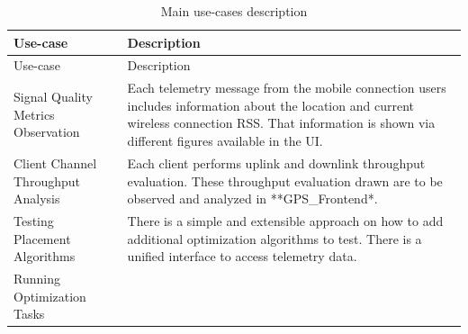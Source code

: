 \begin{longtable}[]{@{}ll@{}}
\caption{Main use-cases description}\tabularnewline
\toprule
\begin{minipage}[b]{0.31\columnwidth}\raggedright
Use-case\strut
\end{minipage} & \begin{minipage}[b]{0.63\columnwidth}\raggedright
Description\strut
\end{minipage}\tabularnewline
\midrule
\endfirsthead
\toprule
\begin{minipage}[b]{0.31\columnwidth}\raggedright
Use-case\strut
\end{minipage} & \begin{minipage}[b]{0.63\columnwidth}\raggedright
Description\strut
\end{minipage}\tabularnewline
\midrule
\endhead
\begin{minipage}[t]{0.31\columnwidth}\raggedright
Signal Quality Metrics Observation\strut
\end{minipage} & \begin{minipage}[t]{0.63\columnwidth}\raggedright
Each telemetry message from the mobile connection users includes
information about the location and current wireless connection RSS. That
information is shown via different figures available in the UI.\strut
\end{minipage}\tabularnewline
\begin{minipage}[t]{0.31\columnwidth}\raggedright
Client Channel Throughput Analysis\strut
\end{minipage} & \begin{minipage}[t]{0.63\columnwidth}\raggedright
Each client performs uplink and downlink throughput evaluation. These
throughput evaluation drawn are to be observed and analyzed in
**GPS\_Frontend*.\strut
\end{minipage}\tabularnewline
\begin{minipage}[t]{0.31\columnwidth}\raggedright
Testing Placement Algorithms\strut
\end{minipage} & \begin{minipage}[t]{0.63\columnwidth}\raggedright
There is a simple and extensible approach on how to add additional
optimization algorithms to test. There is a unified interface to access
telemetry data.\strut
\end{minipage}\tabularnewline
\begin{minipage}[t]{0.31\columnwidth}\raggedright
Running Optimization Tasks\strut
\end{minipage} & \begin{minipage}[t]{0.63\columnwidth}\raggedright

\end{minipage}
\end{longtable}
